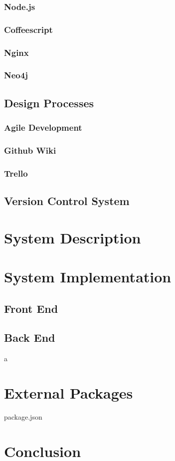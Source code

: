 \documentclass[11pt]{article}
\begin{document}
\subsubsection {Node.js}
\subsubsection {Coffeescript}
\subsubsection {Nginx}
\subsubsection {Neo4j}

\subsection {Design Processes}

\subsubsection {Agile Development}
\subsubsection {Github Wiki}
\subsubsection {Trello}

\subsection {Version Control System}

\section {System Description}

\section {System Implementation}
\subsection {Front End}
\subsection {Back End}
a
\section {External Packages}

package.json

\section {Conclusion}
\end{document}
